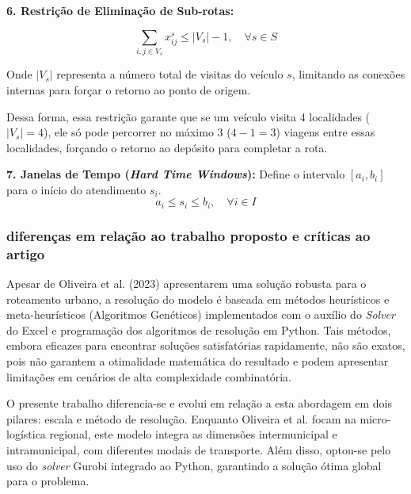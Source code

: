 \textbf{6. Restrição de Eliminação de Sub-rotas:}

\begin{equation}
\sum_{i,j \in V_s} x_{ij}^s \leq |V_s| - 1, \quad \forall s \in S
\end{equation}

Onde $|V_s|$ representa a número total de visitas do veículo $s$, limitando as conexões internas para forçar o retorno ao ponto de origem.

Dessa forma, essa restrição garante que se um veículo visita 4 localidades ($|V_s| = 4$), ele só pode percorrer no máximo 3 ($4-1=3$) viagens entre essas localidades, forçando o retorno ao depósito para completar a rota.

\textbf{7. Janelas de Tempo (\textit{Hard Time Windows}):}
Define o intervalo $[a_i, b_i]$ para o início do atendimento $s_i$.
\begin{equation}
a_i \leq s_i \leq b_i, \quad \forall i \in I
\end{equation}

\subsubsection{diferenças em relação ao trabalho proposto e críticas ao artigo}

Apesar de Oliveira et al. (2023) apresentarem uma solução robusta para o roteamento urbano, a resolução do modelo é baseada em métodos heurísticos e meta-heurísticos (Algoritmos Genéticos) implementados com o auxílio do \textit{Solver} do Excel e programação dos algoritmos de resolução em Python. Tais métodos, embora eficazes para encontrar soluções satisfatórias rapidamente, não são exatos, pois não garantem a otimalidade matemática do resultado e podem apresentar limitações em cenários de alta complexidade combinatória.

O presente trabalho diferencia-se e evolui em relação a esta abordagem em dois pilares: escala e método de resolução. Enquanto Oliveira et al. focam na micro-logística regional, este modelo integra as dimensões intermunicipal e intramunicipal, com diferentes modais de transporte. Além disso, optou-se pelo uso do \textit{solver} Gurobi integrado ao Python, garantindo a solução ótima global para o problema.

\bigskip